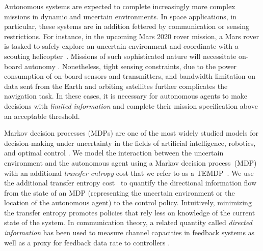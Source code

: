 Autonomous systems are expected to complete increasingly more complex missions in dynamic and uncertain environments. In space applications, in particular, these systems are in addition  fettered by communication or sensing restrictions. For instance, in the upcoming  Mars 2020 rover mission,  a Mars rover is tasked to safely explore an uncertain environment  and coordinate with a scouting helicopter~\cite{landau2015helicopter}. Missions of such sophisticated nature will necessitate on-board autonomy \cite{francis2017advanced,estlin2007increased}. Nonetheless, tight sensing constraints, due to the power consumption of on-board sensors and transmitters, and  bandwidth limitation on data sent from the Earth and orbiting satellites \cite{sherwood2014,Backes1999} further complicates the navigation task. In these cases, it is necessary  for autonomous agents to make decisions with \emph{limited information} and  complete their mission specification above an acceptable threshold. %

Markov decision processes (MDPs) are one of the most widely studied models for decision-making under uncertainty in the fields of artificial intelligence, robotics, and optimal control \cite{Papadimitriou87}. We model the interaction between the uncertain environment and the autonomous agent using a Markov decision process~(MDP) with an additional \emph{transfer entropy} cost that we refer to as a TEMDP~\cite{takashi17}.   We use the additional transfer entropy cost~\cite{schreiber2000} to quantify the directional information flow  from the state of an MDP (representing the uncertain environment or the location of the autonomous agent) to the control policy. Intuitively, minimizing the transfer entropy promotes policies that rely less on knowledge of the current state of the system. In communication theory, a related quantity called \emph{directed information} has been used to measure channel capacities in feedback systems \cite{massey1990causality,tatikonda2009capacity} as well as a proxy for feedback data rate to controllers \cite{silva2011achievable}. 


